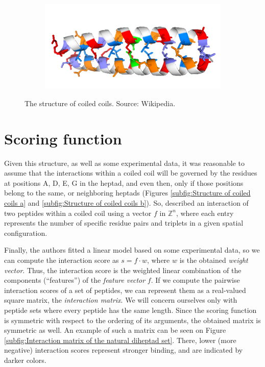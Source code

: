 \documentclass[12pt,a4paper,titlepage,openany]{report}
\begin{document}
\begin{figure}[h]
\begin{subfigure}{0.48\linewidth}
		\caption{}
		\label{subfig:Structure of coiled coils c}
	\end{subfigure}
	~
	\begin{subfigure}{0.48\linewidth}
		\includegraphics[width=\linewidth]{coiled_coil_structure_d}
		\caption{}
		\label{subfig:Structure of coiled coils d}
	\end{subfigure}
	\caption{The structure of coiled coils. Source: Wikipedia.}
	\label{fig:Structure of coiled coils}
\end{figure}

\section{Scoring function}
\label{sec:Scoring function}

Given this structure, as well as some experimental data, it was reasonable to assume that the interactions within a coiled coil will be governed by the residues at positions A, D, E, G in the heptad, and even then, only if those positions belong to the same, or neighboring heptads (Figures \ref{subfig:Structure of coiled coils a} and \ref{subfig:Structure of coiled coils b}). So, \cite{potapov2015data} described an interaction of two peptides within a coiled coil using a vector $f$ in $\mathbb Z^n$, where each entry represents the number of specific residue pairs and triplets in a given spatial configuration. 

Finally, the authors fitted a linear model based on some experimental data, so we can compute the interaction score as $s = f \cdot w$, where $w$ is the obtained \emph{weight vector}. Thus, the interaction score is the weighted linear combination of the components (``features'') of the \emph{feature vector} $f$.  If we compute the pairwise interaction scores of a set of peptides, we can represent them as a real-valued square matrix, the \emph{interaction matrix}. We will concern ourselves only with peptide sets where every peptide has the same length. Since the scoring function is symmetric with respect to the ordering of its arguments, the obtained matrix is symmetric as well. An example of such a matrix can be seen on Figure \ref{subfig:Interaction matrix of the natural diheptad set}. There, lower (more negative) interaction scores represent stronger binding, and are indicated by darker colors. 
\end{document}
